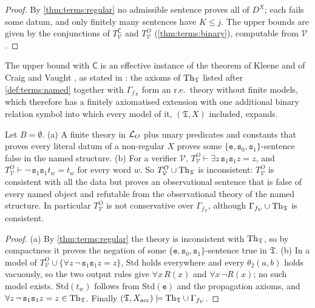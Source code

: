 \begin{proof}
By \cref{thm:terms:regular} no admissible sentence proves all of $D^X$; each fails some datum, and only finitely many sentences have $K\le j$. The upper bounds are given by the conjunctions of $T^{\mathsf C}_{\mathcal V}$ and $T^O_{\mathcal V}$ (\cref{thm:terms:binary}), computable from $\mathcal V$.
\end{proof}

The upper bound with $\mathsf C$ is an effective instance of the theorem of Kleene and of Craig and Vaught \citep{kleene1952finite,craigvaught1958finite}, as stated in \citet{pakhomov2019question}: the axioms of $\mathrm{Th}_{\mathfrak{T}}$ listed after \cref{def:terms:named} together with $\Gamma_{f_X}$ form an r.e.\ theory without finite models, which therefore has a finitely axiomatised extension with one additional binary relation symbol into which every model of it, $(\mathfrak T,X)$ included, expands.

\begin{proposition}\label{prop:terms:ontology}
Let $B=\emptyset$.
(a) A finite theory in $\mathcal{L}_{O}$ plus unary predicates and constants that proves every literal datum of a non-regular $X$ proves some $\{\mathtt e,\mathtt s_0,\mathtt s_1\}$-sentence false in the named structure.
(b) For a verifier $\mathcal V$, $T^O_{\mathcal V}\vdash\exists z\,\mathtt s_1\mathtt s_1z=z$, and $T^O_{\mathcal V}\vdash\neg\,\mathtt s_1\mathtt s_1t_w=t_w$ for every word $w$. So $T^O_{\mathcal V}\cup\mathrm{Th}_{\mathfrak{T}}$ is inconsistent: $T^O_{\mathcal V}$ is consistent with all the data but proves an observational sentence that is false of every named object and refutable from the observational theory of the named structure. In particular $T^O_{\mathcal V}$ is not conservative over $\Gamma_{f_{\mathcal V}}$, although $\Gamma_{f_{\mathcal V}}\cup\mathrm{Th}_{\mathfrak{T}}$ is consistent.
\end{proposition}

\begin{proof}
(a) By \cref{thm:terms:regular} the theory is inconsistent with $\mathrm{Th}_{\mathfrak{T}}$, so by compactness it proves the negation of some $\{\mathtt e,\mathtt s_0,\mathtt s_1\}$-sentence true in $\mathfrak T$. (b) In a model of $T^O_{\mathcal V}\cup\{\forall z\,\neg\,\mathtt s_1\mathtt s_1z=z\}$, $\mathrm{Std}$ holds everywhere and every $\theta_2(a,b)$ holds vacuously, so the two output rules give $\forall x\,R(x)$ and $\forall x\,\neg R(x)$; no such model exists. $\mathrm{Std}(t_w)$ follows from $\mathrm{Std}(\mathtt e)$ and the propagation axioms, and $\forall z\,\neg\,\mathtt s_1\mathtt s_1z=z\in\mathrm{Th}_{\mathfrak{T}}$. Finally $(\mathfrak T,X_{\rm acc})\models\mathrm{Th}_{\mathfrak{T}}\cup\Gamma_{f_{\mathcal V}}$.
\end{proof}

